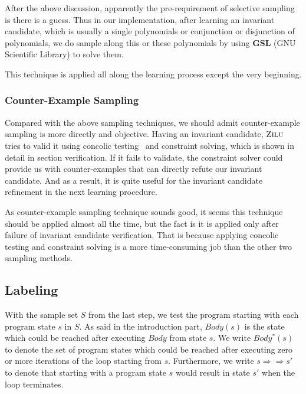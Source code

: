 After the above discussion, apparently the pre-requirement of selective sampling is there is a guess.
Thus in our implementation, after learning an invariant candidate, 
which is usually a single polynomials or conjunction or disjunction of polynomials,
we do sample along this or these polynomials by using \textbf{GSL} (GNU Scientific Library) to solve them.

This technique is applied all along the learning process except the very beginning.



\subsubsection{Counter-Example Sampling}
Compared with the above sampling techniques, we should admit counter-example sampling is more directly and objective.  
Having an invariant candidate, $\textsc{Zilu}$ tries to valid it using concolic testing~\cite{} and constraint solving,
which is shown in detail in section verification.
If it fails to validate, the constraint solver could provide us with counter-examples that can directly refute our invariant candidate.
And as a result, it is quite useful for the invariant candidate refinement in the next learning procedure.

As counter-example sampling technique sounds good, it seems this technique should be applied almost all the time, 
but the fact is it is applied only after failure of invariant candidate verification.
That is because applying concolic testing and constraint solving is a more time-consuming job than the other two sampling methods.

\subsection {Labeling}
With the sample set $S$ from the last step, we test the program starting with each program state $s$ in $S$. 
As said in the introduction part, $Body(s)$ is the state which could be reached after executing $Body$ from state $s$.
We write $Body^*(s)$ to denote the set of program states which could be reached after executing zero or more iterations of the loop starting from $s$.
Furthermore, we write $s \Rightarrow\Rightarrow s'$ to denote that starting with a program state $s$ would result in state $s'$ when the loop terminates. 

